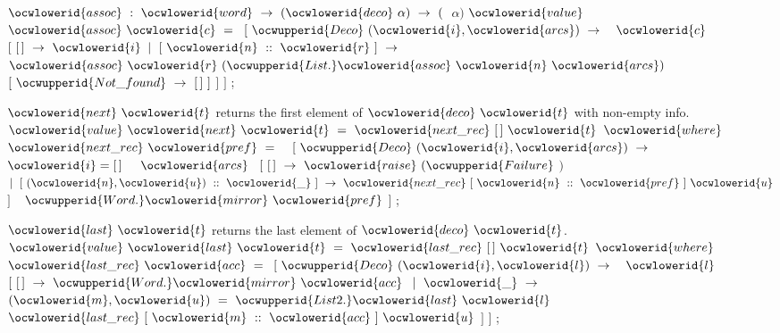 \documentclass[12pt]{article}
\begin{document}
\ocwendcode{}\ocwindent{0.00em}
\ocwbegindcode{}$\ocwlowerid{assoc}~:~\ocwlowerid{word}~\rightarrow{}~(\ocwlowerid{deco}~\alpha{})~\rightarrow{}~($~$\alpha{})$\ocwenddcode{} 
\ocweol
\label{../ML/deco.ml:4788}%
\medskip
\ocwbegincode{}\ocwindent{0.00em}
$\ocwlowerid{value}~$~$\ocwlowerid{assoc}~\ocwlowerid{c}~=~$\ocweol
\ocwindent{1.00em}
$[~\ocwupperid{Deco}~(\ocwlowerid{i},\ocwlowerid{arcs})~\rightarrow{}~$~$\ocwlowerid{c}~$\ocweol
\ocwindent{2.00em}
$[~[\,]~\rightarrow{}~\ocwlowerid{i}$\ocweol
\ocwindent{2.00em}
$\mid{}~[~\ocwlowerid{n}~::~\ocwlowerid{r}~]~\rightarrow{}~$~$\ocwlowerid{assoc}~\ocwlowerid{r}~(\ocwupperid{List.}\ocwlowerid{assoc}~\ocwlowerid{n}~\ocwlowerid{arcs})$\ocweol
\ocwindent{10.00em}
~$[~\ocwupperid{Not\_found}~\rightarrow{}~[\,]~]$\ocweol
\ocwindent{2.00em}
$]$\ocweol
\ocwindent{1.00em}
$]$\ocweol
\ocwindent{0.00em}
;\medskip

\ocwendcode{}\ocwindent{0.00em}
\ocwbegindcode{}$\ocwlowerid{next}~\ocwlowerid{t}$\ocwenddcode{} returns the first element of \ocwbegindcode{}$\ocwlowerid{deco}~\ocwlowerid{t}$\ocwenddcode{} with non-empty info. 
\ocweol
\label{../ML/deco.ml:5044}%
\medskip
\ocwbegincode{}\ocwindent{0.00em}
$\ocwlowerid{value}~\ocwlowerid{next}~\ocwlowerid{t}~=~\ocwlowerid{next\_rec}~[\,]~\ocwlowerid{t}$\ocweol
\ocwindent{1.00em}
$\ocwlowerid{where}~$~$\ocwlowerid{next\_rec}~\ocwlowerid{pref}~=~$~\ocweol
\ocwindent{2.00em}
$[~\ocwupperid{Deco}~(\ocwlowerid{i},\ocwlowerid{arcs})~\rightarrow{}~$\ocweol
\ocwindent{3.00em}
~$\ocwlowerid{i}=[\,]~$~~$\ocwlowerid{arcs}~$\ocweol
\ocwindent{4.50em}
$[~[\,]~\rightarrow{}~\ocwlowerid{raise}~(\ocwupperid{Failure}~$$)$\ocweol
\ocwindent{4.50em}
$\mid{}~[~(\ocwlowerid{n},\ocwlowerid{u})~::~\ocwlowerid{\_}~]~\rightarrow{}~\ocwlowerid{next\_rec}~[~\ocwlowerid{n}~::~\ocwlowerid{pref}~]~\ocwlowerid{u}$\ocweol
\ocwindent{4.50em}
$]~$\ocweol
\ocwindent{3.00em}
~$\ocwupperid{Word.}\ocwlowerid{mirror}~\ocwlowerid{pref}$\ocweol
\ocwindent{2.00em}
$]$\ocweol
\ocwindent{0.00em}
;\medskip

\ocwendcode{}\ocwindent{0.00em}
\ocwbegindcode{}$\ocwlowerid{last}~\ocwlowerid{t}$\ocwenddcode{} returns the last element of \ocwbegindcode{}$\ocwlowerid{deco}~\ocwlowerid{t}$\ocwenddcode{}. 
\ocweol
\label{../ML/deco.ml:5384}%
\medskip
\ocwbegincode{}\ocwindent{0.00em}
$\ocwlowerid{value}~\ocwlowerid{last}~\ocwlowerid{t}~=~\ocwlowerid{last\_rec}~[\,]~\ocwlowerid{t}$\ocweol
\ocwindent{1.50em}
$\ocwlowerid{where}~$~$\ocwlowerid{last\_rec}~\ocwlowerid{acc}~=~$\ocweol
\ocwindent{2.50em}
$[~\ocwupperid{Deco}~(\ocwlowerid{i},\ocwlowerid{l})~\rightarrow{}~$~$\ocwlowerid{l}~$\ocweol
\ocwindent{3.50em}
$[~[\,]~\rightarrow{}~\ocwupperid{Word.}\ocwlowerid{mirror}~\ocwlowerid{acc}~$\ocweol
\ocwindent{3.50em}
$\mid{}~\ocwlowerid{\_}~\rightarrow{}~$~$(\ocwlowerid{m},\ocwlowerid{u})~=~\ocwupperid{List2.}\ocwlowerid{last}~\ocwlowerid{l}~$\ocweol
\ocwindent{7.00em}
$\ocwlowerid{last\_rec}~[~\ocwlowerid{m}~::~\ocwlowerid{acc}~]~\ocwlowerid{u}$\ocweol
\ocwindent{3.50em}
$]$\ocweol
\ocwindent{2.50em}
$]$\ocweol
\ocwindent{0.00em}
;\medskip
\end{document}
